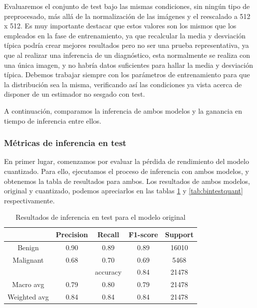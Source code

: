 Evaluaremos el conjunto de test bajo las mismas condiciones, sin ningún tipo de preprocesado, más allá de la normalización de las imágenes y el reescalado a 512 x 512. Es muy importante destacar que estos valores son los mismos que los empleados en la fase de entrenamiento, ya que recalcular la media y desviación típica podría crear mejores resultados pero no ser una prueba representativa, ya que al realizar una inferencia de un diagnóstico, esta normalmente se realiza con una única imagen, y no habría datos suficientes para hallar la media y desviación típica. Debemos trabajar siempre con los parámetros de entrenamiento para que la distribución sea la misma, verificando así las condiciones ya vista acerca de disponer de un estimador no sesgado con test.

A continuación, comparamos la inferencia de ambos modelos y la ganancia en tiempo de inferencia entre ellos.

\subsubsection{Métricas de inferencia en test}

En primer lugar, comenzamos por evaluar la pérdida de rendimiento del modelo cuantizado. Para ello, ejecutamos el proceso de inferencia con ambos modelos, y obtenemos la tabla de resultados para ambos.
Los resultados de ambos modelos, original y cuantizado, podemos apreciarlos en las tablas \ref{tab:bintestorig} y \ref{tab:bintestquant} respectivamente.

\begin{table}[!ht]
	\centering
	\begin{tabular}{|c|c|c|c|c|}
		\hline
		~ & Precision & Recall & F1-score & Support \\ \hline
		Benign & 0.90 & 0.89 & 0.89 & 16010 \\ 
		Malignant & 0.68 & 0.70 & 0.69 & 5468 \\ \hline
		~ & ~ & accuracy & 0.84 & 21478 \\ \hline
		Macro avg & 0.79 & 0.80 & 0.79 & 21478 \\ 
		Weighted avg & 0.84 & 0.84 & 0.84 & 21478 \\ \hline
	\end{tabular}
	\caption{Resultados de inferencia en test para el modelo original}
	\label{tab:bintestorig}
\end{table}



